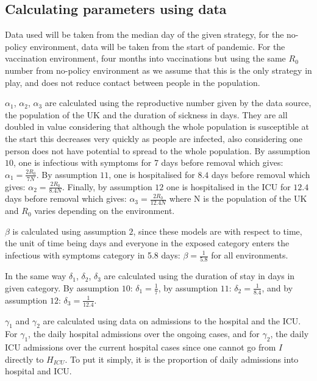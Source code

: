 \documentclass[11pt]{article}
\begin{document}
\subsection{Calculating parameters using data}
Data used will be taken from the median day of the given strategy, for the no-policy environment, data will be taken from the start of pandemic. For the vaccination environment, four months into vaccinations but using the same $R_0$ number from no-policy environment as we assume that this is the only strategy in play, and does not reduce contact between people in the population. \par
$\alpha_1$, $\alpha_2$, $\alpha_3$ are calculated using the reproductive number given by the data source, the population of the UK and the duration of sickness in days. They are all doubled in value considering that although the whole population is susceptible at the start this decreases very quickly as people are infected, also considering one person does not have potential to spread to the whole population. By assumption $10$, one is infectious with symptoms for 7 days before removal which gives: $\alpha_1=\frac{2R_0}{7N}$. By assumption $11$, one is hospitalised for $8.4$ days before removal which gives: $\alpha_2=\frac{2R_0}{8.4N}$. Finally, by assumption $12$ one is hospitalised in the ICU for $12.4$ days before removal which gives: $\alpha_3=\frac{2R_0}{12.4N}$ where N is the population of the UK and $R_0$ varies depending on the environment. \par
$\beta$ is calculated using assumption $2$, since these models are with respect to time, the unit of time being days and everyone in the exposed category enters the infectious with symptoms category in 5.8 days: $\beta=\frac{1}{5.8}$ for all environments. \par
In the same way $\delta_1$, $\delta_2$, $\delta_3$ are calculated using the duration of stay in days in given category. By assumption $10$: $\delta_1=\frac{1}{7}$, by assumption $11$: $\delta_2=\frac{1}{8.4}$, and by assumption $12$: $\delta_3=\frac{1}{12.4}$. \par
$\gamma_1$ and $\gamma_2$ are calculated using data on admissions to the hospital and the ICU. For $\gamma_1$, the daily hospital admissions over the ongoing cases, and for $\gamma_2$, the daily ICU admissions over the current hospital cases since one cannot go from $I$ directly to $H_{ICU}$. To put it simply, it is the proportion of daily admissions into hospital and ICU.
\end{document}
